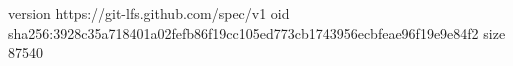 version https://git-lfs.github.com/spec/v1
oid sha256:3928c35a718401a02fefb86f19cc105ed773cb1743956ecbfeae96f19e9e84f2
size 87540
